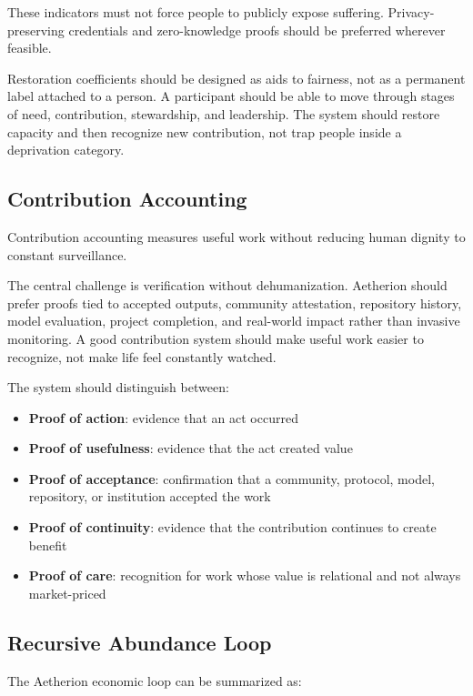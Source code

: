 \documentclass[12pt]{article}
\begin{document}
These indicators must not force people to publicly expose suffering. Privacy-preserving credentials and zero-knowledge proofs should be preferred wherever feasible.

Restoration coefficients should be designed as aids to fairness, not as a permanent label attached to a person. A participant should be able to move through stages of need, contribution, stewardship, and leadership. The system should restore capacity and then recognize new contribution, not trap people inside a deprivation category.

\subsection{Contribution Accounting}

Contribution accounting measures useful work without reducing human dignity to constant surveillance.

The central challenge is verification without dehumanization. Aetherion should prefer proofs tied to accepted outputs, community attestation, repository history, model evaluation, project completion, and real-world impact rather than invasive monitoring. A good contribution system should make useful work easier to recognize, not make life feel constantly watched.

The system should distinguish between:

\begin{itemize}
  \item \textbf{Proof of action}: evidence that an act occurred
  \item \textbf{Proof of usefulness}: evidence that the act created value
  \item \textbf{Proof of acceptance}: confirmation that a community, protocol, model, repository, or institution accepted the work
  \item \textbf{Proof of continuity}: evidence that the contribution continues to create benefit
  \item \textbf{Proof of care}: recognition for work whose value is relational and not always market-priced
\end{itemize}

\subsection{Recursive Abundance Loop}

The Aetherion economic loop can be summarized as:
\end{document}
